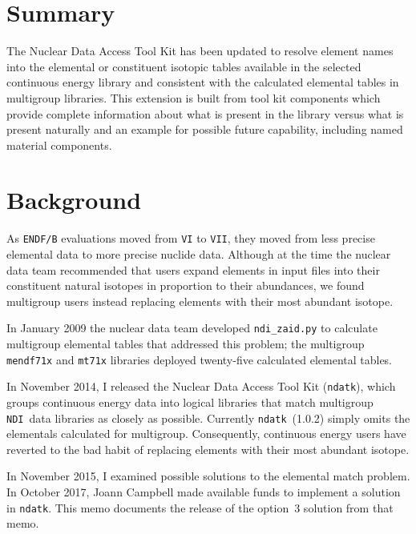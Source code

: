 \documentclass[12pt]{lamemo}
\date{December 13, 2017}
\newcommand{\ndatk}{\texttt{ndatk}}
\newcommand{\NDI}{\texttt{NDI}}
\begin{document}
\lstset{language=C++}

\maketitle			%

\section{Summary}

The Nuclear Data Access Tool Kit has been updated to resolve element
names into the elemental or constituent isotopic tables available in
the selected continuous energy library and consistent with the
calculated elemental tables in multigroup libraries.  This extension
is built from tool kit components which provide complete information
about what is present in the library versus what is present naturally
and an example for possible future capability, including named
material components.

\section{Background}

As \texttt{ENDF/B} evaluations moved from \texttt{VI} to \texttt{VII},
they moved from less precise elemental data to more precise nuclide
data.  Although at the time the nuclear data team recommended that
users expand elements in input files into their constituent natural
isotopes in proportion to their abundances, we found multigroup users
instead replacing elements with their most abundant isotope.

In January 2009 the nuclear data team developed \texttt{ndi\_zaid.py}
to calculate multigroup elemental tables\cite{gray09} that addressed
this problem; the multigroup \texttt{mendf71x} and \texttt{mt71x}
libraries deployed twenty-five calculated elemental tables.

In November 2014, I released the Nuclear Data Access Tool Kit
(\ndatk)\cite{gray14}, which groups continuous energy data into
logical libraries that match multigroup \NDI\ data libraries as
closely as possible.  Currently \ndatk\ (1.0.2) simply omits the
elementals calculated for multigroup.  Consequently, continuous energy
users have reverted to the bad habit of replacing elements with their
most abundant isotope.
 
In November 2015, I examined possible solutions to the elemental match
problem\cite{gray15}.  In October 2017, Joann Campbell made available
funds to implement a solution in \ndatk. This memo documents the
release of the option~3 solution from that memo.
\end{document}
